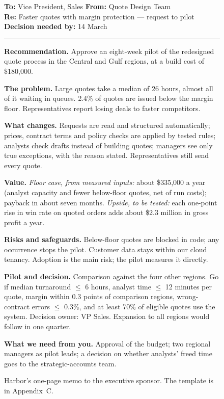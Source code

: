 \begin{figure}[htbp]
\begin{tcolorbox}[colback=white, colframe=black!60, boxrule=0.6pt, arc=1pt, left=10pt, right=10pt, top=8pt, bottom=8pt, fontupper=\small]
\textbf{To:} Vice President, Sales \hfill \textbf{From:} Quote Design Team\\
\textbf{Re:} Faster quotes with margin protection --- request to pilot \hfill \textbf{Decision needed by:} 14 March

\smallskip\hrule\smallskip

\textbf{Recommendation.} Approve an eight-week pilot of the redesigned quote process in the Central and Gulf regions, at a build cost of \$180{,}000.

\textbf{The problem.} Large quotes take a median of 26 hours, almost all of it waiting in queues. 2.4\% of quotes are issued below the margin floor. Representatives report losing deals to faster competitors.

\textbf{What changes.} Requests are read and structured automatically; prices, contract terms and policy checks are applied by tested rules; analysts check drafts instead of building quotes; managers see only true exceptions, with the reason stated. Representatives still send every quote.

\textbf{Value.} \emph{Floor case, from measured inputs:} about \$335{,}000 a year (analyst capacity and fewer below-floor quotes, net of run costs); payback in about seven months. \emph{Upside, to be tested:} each one-point rise in win rate on quoted orders adds about \$2.3 million in gross profit a year.

\textbf{Risks and safeguards.} Below-floor quotes are blocked in code; any occurrence stops the pilot. Customer data stays within our cloud tenancy. Adoption is the main risk; the pilot measures it directly.

\textbf{Pilot and decision.} Comparison against the four other regions. Go if median turnaround $\le$ 6 hours, analyst time $\le$ 12 minutes per quote, margin within 0.3 points of comparison regions, wrong-contract errors $\le$ 0.3\%, and at least 70\% of eligible quotes use the system. Decision owner: VP Sales. Expansion to all regions would follow in one quarter.

\textbf{What we need from you.} Approval of the budget; two regional managers as pilot leads; a decision on whether analysts' freed time goes to the strategic-accounts team.
\end{tcolorbox}
\caption{Harbor's one-page memo to the executive sponsor. The template is in Appendix~C.}
\label{fig:memo}
\end{figure}

